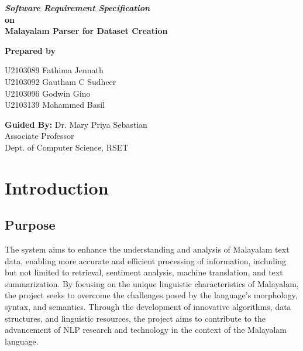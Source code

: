 \documentclass[12pt]{article}
\begin{document}
	\newpage
	
	\begin{center}
		
		
		\textbf{\textit{
				{\fontsize{16pt}{19.2pt}\selectfont
					Software Requirement Specification}}\medskip
			{\fontsize{14pt}{16.8pt}\selectfont
				\\on\medskip\\Malayalam Parser for Dataset Creation}
		}
		
		\bigskip \bigskip \bigskip
		\bigskip \bigskip \bigskip
		
		{\setstretch{3.0}
			
			\textbf{{\fontsize{14pt}{16.8pt}\selectfont Prepared by\\}}
			
			U2103089 Fathima Jennath\\
			U2103092 Gautham C Sudheer\\
			U2103096 Godwin Gino\\
			U2103139 Mohammed Basil\\
		}
	
		\bigskip \bigskip \bigskip
		\bigskip \bigskip \bigskip
	
	
		{\fontsize{16pt}{19.2pt}\selectfont \textbf{Guided By: } Dr. Mary Priya Sebastian\\
		\hspace{1.8cm}Associate Professor\\
		\hspace{5.2cm}Dept. of Computer Science, RSET\\}
		
	\end{center}
	
	\newpage
	\pagestyle{headerstyle}
	
	\renewcommand{\contentsname}{Table of Contents}
	\tableofcontents
	
	\newpage
	\setcounter{page}{1}
	
	\section{Introduction}
	
	\subsection{Purpose}
	The system aims to enhance the understanding and analysis of Malayalam text data, enabling more accurate and efficient processing of information, including but not limited to retrieval, sentiment analysis, machine translation, and text summarization. By focusing on the unique linguistic characteristics of Malayalam, the project seeks to overcome the challenges posed by the language's morphology, syntax, and semantics. Through the development of innovative algorithms, data structures, and linguistic resources, the project aims to contribute to the advancement of NLP research and technology in the context of the Malayalam language.
	
\end{document}

